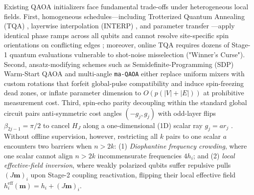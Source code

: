 \documentclass[10pt,a4paper]{article}
\begin{document}
Existing QAOA initializers face fundamental trade-offs under heterogeneous local fields. First, homogeneous schedules---including Trotterized Quantum Annealing (TQA) \citep{farhi2001quantum,kadowaki1998quantum,yang2017optimizing,sack2021quantum,wurtz2022counterdiabaticity}, layerwise interpolation (INTERP) \citep{crooks2018performance,zhou2020quantum}, and parameter transfer \citep{brandao2018fixed,galda2021transferability,shaydulin2023parameter}---apply identical phase ramps across all qubits and cannot resolve site-specific spin orientations on conflicting edges \citep{katial2025instance}; moreover, online TQA requires dozens of Stage-1 quantum evaluations vulnerable to shot-noise misselection ("Winner's Curse"). Second, ansatz-modifying schemes such as Semidefinite-Programming (SDP) Warm-Start QAOA \citep{bravyi2020obstacles,egger2021warm,tate2023warm} and multi-angle \texttt{ma-QAOA} \citep{herrman2022multi} either replace uniform mixers with custom rotations that forfeit global-pulse compatibility and induce spin-freezing dead zones, or inflate parameter dimension to $O(p(|V|+|E|))$ at prohibitive measurement cost. Third, spin-echo parity decoupling within the standard global circuit \citep{hahn1950spin,carr1954effects,viola1999dynamical,vandersypen2005nmr,yao2026echo} pairs anti-symmetric cost angles $(-g_j, g_j)$ with odd-layer flips $\beta_{2j-1} = \pi/2$ to cancel $H_J$ along a one-dimensional (1D) scalar ray $g_j = a r_j$ \citep{daubechies1988orthonormal,low2016methodology,low2017optimal,gilyen2019quantum,yao2026echo}. Without offline supervision, however, restricting all $k$ pairs to one scalar $a$ encounters two barriers when $n > 2k$: (1) \emph{Diophantine frequency crowding}, where one scalar cannot align $n > 2k$ incommensurate frequencies $4h_i$; and (2) \emph{local effective-field inversion}, where weakly polarized qubits suffer repulsive pulls $(J\boldsymbol{m})_i$ upon Stage-2 coupling reactivation, flipping their local effective field $h_i^{\mathrm{eff}}(\boldsymbol{m}) = h_i + (J\boldsymbol{m})_i$.
\end{document}
